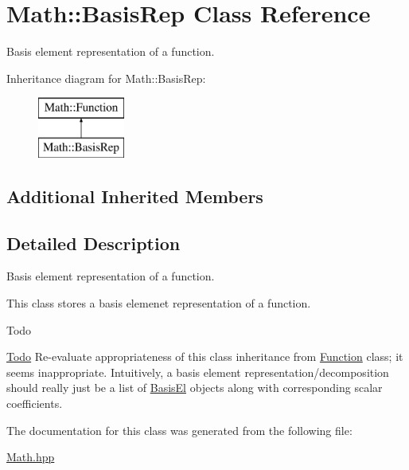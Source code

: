 \hypertarget{class_math_1_1_basis_rep}{}\section{Math\+:\+:Basis\+Rep Class Reference}
\label{class_math_1_1_basis_rep}


Basis element representation of a function.  


Inheritance diagram for Math\+:\+:Basis\+Rep\+:\begin{figure}[H]
\begin{center}
\leavevmode
\includegraphics[height=2.000000cm]{class_math_1_1_basis_rep}
\end{center}
\end{figure}
\subsection*{Additional Inherited Members}


\subsection{Detailed Description}
Basis element representation of a function. 

This class stores a basis elemenet representation of a function. \begin{DoxyRefDesc}{Todo}
\item[\mbox{\hyperlink{todo__todo000001}{Todo}}]Re-\/evaluate appropriateness of this class\textquotesingle{} inheritance from \mbox{\hyperlink{class_math_1_1_function}{Function}} class; it seems inappropriate. Intuitively, a basis element representation/decomposition should really just be a list of \mbox{\hyperlink{class_math_1_1_basis_el}{Basis\+El}} objects along with corresponding scalar coefficients. \end{DoxyRefDesc}


The documentation for this class was generated from the following file\+:\begin{DoxyCompactItemize}
\item 
\mbox{\hyperlink{_math_8hpp}{Math.\+hpp}}\end{DoxyCompactItemize}
